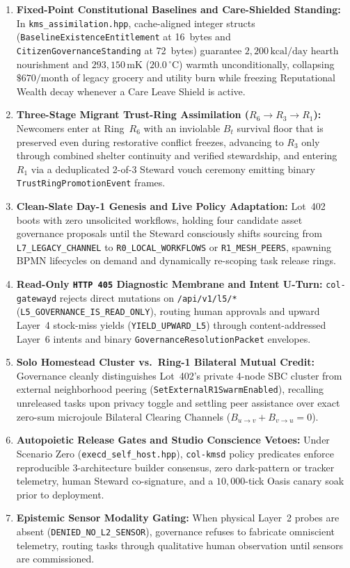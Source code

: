 \begin{enumerate}
\item \textbf{Fixed-Point Constitutional Baselines and Care-Shielded Standing:} In
        \texttt{kms\_assimilation.hpp}, cache-aligned integer structs
        (\texttt{BaselineExistenceEntitlement} at 16~bytes and
        \texttt{CitizenGovernanceStanding} at 72~bytes) guarantee $2{,}200\,\mathrm{kcal/day}$
        hearth nourishment and $293{,}150\,\mathrm{mK}$ ($20.0\,^\circ\mathrm{C}$) warmth
        unconditionally, collapsing $\$670/\mathrm{month}$ of legacy grocery and utility burn
        while freezing Reputational Wealth decay whenever a Care Leave Shield is active.
\item \textbf{Three-Stage Migrant Trust-Ring Assimilation ($R_6 \to R_3 \to R_1$):} Newcomers
        enter at Ring~$R_6$ with an inviolable $B_t$ survival floor that is preserved even
        during restorative conflict freezes, advancing to $R_3$ only through combined shelter
        continuity and verified stewardship, and entering $R_1$ via a deduplicated 2-of-3
        Steward vouch ceremony emitting binary \texttt{TrustRingPromotionEvent} frames.
\item \textbf{Clean-Slate Day-1 Genesis and Live Policy Adaptation:} Lot~402 boots with zero
        unsolicited workflows, holding four candidate asset governance proposals until the
        Steward consciously shifts sourcing from \texttt{L7\_LEGACY\_CHANNEL} to
        \texttt{R0\_LOCAL\_WORKFLOWS} or \texttt{R1\_MESH\_PEERS}, spawning BPMN lifecycles on
        demand and dynamically re-scoping task release rings.
\item \textbf{Read-Only \texttt{HTTP 405} Diagnostic Membrane and Intent U-Turn:}
        \texttt{col-gatewayd} rejects direct mutations on \texttt{/api/v1/l5/*}
        (\texttt{L5\_GOVERNANCE\_IS\_READ\_ONLY}), routing human approvals and upward Layer~4
        stock-miss yields (\texttt{YIELD\_UPWARD\_L5}) through content-addressed Layer~6
        intents and binary \texttt{GovernanceResolutionPacket} envelopes.
\item \textbf{Solo Homestead Cluster vs.\ Ring-1 Bilateral Mutual Credit:} Governance cleanly
        distinguishes Lot~402's private 4-node SBC cluster from external neighborhood peering
        (\texttt{SetExternalR1SwarmEnabled}), recalling unreleased tasks upon privacy toggle
        and settling peer assistance over exact zero-sum microjoule Bilateral Clearing Channels
        ($B_{u\to v} + B_{v\to u} = 0$).
\item \textbf{Autopoietic Release Gates and Studio Conscience Vetoes:} Under Scenario Zero
        (\texttt{execd\_self\_host.hpp}), \texttt{col-kmsd} policy predicates enforce
        reproducible 3-architecture builder consensus, zero dark-pattern or tracker telemetry,
        human Steward co-signature, and a $10{,}000$-tick Oasis canary soak prior to deployment.
\item \textbf{Epistemic Sensor Modality Gating:} When physical Layer~2 probes are absent
        (\texttt{DENIED\_NO\_L2\_SENSOR}), governance refuses to fabricate omniscient telemetry,
        routing tasks through qualitative human observation until sensors are commissioned.
\end{enumerate}

